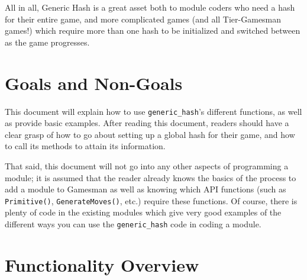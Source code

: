 \documentclass[11pt]{article}
\begin{document}
All in all, Generic Hash is a great asset both to module coders who need a hash for their entire game, and more complicated games (and all Tier-Gamesman games!) which require more than one hash to be initialized and switched between as the game progresses.

\section{Goals and Non-Goals}
This document will explain how to use \texttt{generic\_hash}'s different functions, as well as provide basic examples. After reading this document, readers should have a clear grasp of how to go about setting up a global hash for their game, and how to call its methods to attain its information.

That said, this document will not go into any other aspects of programming a module; it is assumed that the reader already knows the basics of the process to add a module to Gamesman as well as knowing which API functions (such as \texttt{Primitive()}, \texttt{GenerateMoves()}, etc.) require these functions. Of course, there is plenty of code in the existing modules which give very good examples of the different ways you can use the \texttt{generic\_hash} code in coding a module.


\section{Functionality Overview}
\end{document}
